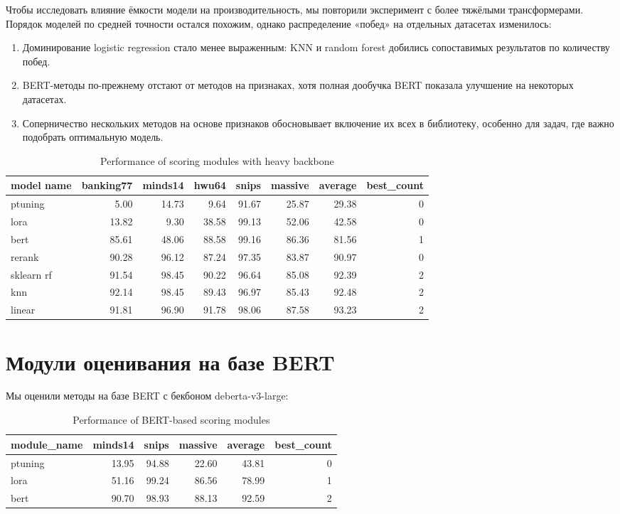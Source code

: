 \documentclass[14pt,a4paper,oneside,openany]{extbook}
\begin{document}
Чтобы исследовать влияние ёмкости модели на производительность, мы повторили эксперимент с более тяжёлыми трансформерами. Порядок моделей по средней точности остался похожим, однако распределение «побед» на отдельных датасетах изменилось:

\begin{enumerate}
\item Доминирование logistic regression стало менее выраженным: KNN и random forest добились сопоставимых результатов по количеству побед.
\item BERT-методы по-прежнему отстают от методов на признаках, хотя полная дообучка BERT показала улучшение на некоторых датасетах.
\item Соперничество нескольких методов на основе признаков обосновывает включение их всех в библиотеку, особенно для задач, где важно подобрать оптимальную модель.
\end{enumerate}

\begin{table}[htbp]
\caption{\label{tab:scoring_heavy}Performance of scoring modules with heavy backbone}
\centering
\begin{tabular}{lrrrrrrr}
model name & banking77 & minds14 & hwu64 & snips & massive & average & best\_count\\
\hline
ptuning & 5.00 & 14.73 & 9.64 & 91.67 & 25.87 & 29.38 & 0\\
lora & 13.82 & 9.30 & 38.58 & 99.13 & 52.06 & 42.58 & 0\\
bert & 85.61 & 48.06 & 88.58 & 99.16 & 86.36 & 81.56 & 1\\
rerank & 90.28 & 96.12 & 87.24 & 97.35 & 83.87 & 90.97 & 0\\
sklearn rf & 91.54 & 98.45 & 90.22 & 96.64 & 85.08 & 92.39 & 2\\
knn & 92.14 & 98.45 & 89.43 & 96.97 & 85.43 & 92.48 & 2\\
linear & 91.81 & 96.90 & 91.78 & 98.06 & 87.58 & 93.23 & 2\\
\end{tabular}
\end{table}
\section{Модули оценивания на базе BERT}
\label{sec:org5a9c0fb}

Мы оценили методы на базе BERT с бекбоном deberta-v3-large:

\begin{table}[htbp]
\caption{\label{tab:bert_scoring}Performance of BERT-based scoring modules}
\centering
\begin{tabular}{lrrrrr}
module\_name & minds14 & snips & massive & average & best\_count\\
\hline
ptuning & 13.95 & 94.88 & 22.60 & 43.81 & 0\\
lora & 51.16 & 99.24 & 86.56 & 78.99 & 1\\
bert & 90.70 & 98.93 & 88.13 & 92.59 & 2\\
\end{tabular}
\end{table}
\end{document}
